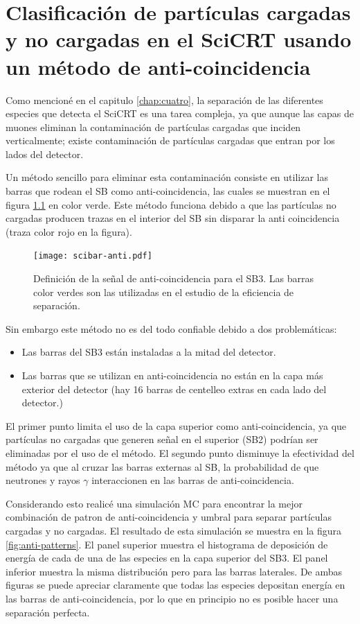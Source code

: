
\chapter{Clasificación de partículas cargadas y no cargadas en el SciCRT usando un método de anti-coincidencia}
\label{chap:apen-a}

Como mencioné en el capitulo \ref{chap:cuatro}, la separación de las diferentes especies que detecta el SciCRT es una tarea compleja, ya que aunque las capas de muones eliminan la contaminación de partículas cargadas que inciden verticalmente; existe contaminación de partículas cargadas que entran por los lados del detector.

Un método sencillo para eliminar esta contaminación consiste en utilizar las barras que rodean el SB como anti-coincidencia, las cuales se muestran en el figura \ref{fig:scibar-anti} en color verde. Este método funciona debido a que las partículas no cargadas producen trazas en el interior del SB sin disparar la anti coincidencia (traza color rojo en la figura).

\begin{figure}
        \centering
        \texttt{[image: scibar-anti.pdf]}
        \caption{Definición de la señal de anti-coincidencia para el SB3. Las barras color verdes son las utilizadas en el estudio de la eficiencia de separación.}
        \label{fig:scibar-anti}
\end{figure}

Sin embargo este método no es del todo confiable debido a dos problemáticas:

\begin{itemize}
  \item Las barras del SB3 están instaladas a la mitad del detector.
  \item Las barras que se utilizan en anti-coincidencia no están en la capa más exterior del detector (hay \num{16} barras de centelleo extras en cada lado del detector.)
\end{itemize}

El primer punto limita el uso de la capa superior como anti-coincidencia, ya que partículas no cargadas que generen señal en el superior (SB2) podrían ser eliminadas por el uso de el método. El segundo punto disminuye la efectividad del método ya que al cruzar las barras externas al SB, la probabilidad de que neutrones y rayos $\gamma$ interaccionen en las barras de anti-coincidencia.

Considerando esto realicé una simulación MC para encontrar la mejor combinación de patron de anti-coincidencia y umbral para separar partículas cargadas y no cargadas. El resultado de esta simulación se muestra en la figura \ref{fig:anti-patterns}. El panel superior muestra el histograma de deposición de energía de cada de una de las especies en la capa superior del SB3. El panel inferior muestra la misma distribución pero para las barras laterales. De ambas figuras se puede apreciar claramente que todas las especies depositan energía en las barras de anti-coincidencia, por lo que en principio no es posible hacer una separación perfecta.

